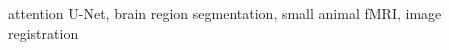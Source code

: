 \begin{IEEEkeywords}
    attention U-Net, brain region segmentation, small animal fMRI, image registration
\end{IEEEkeywords}